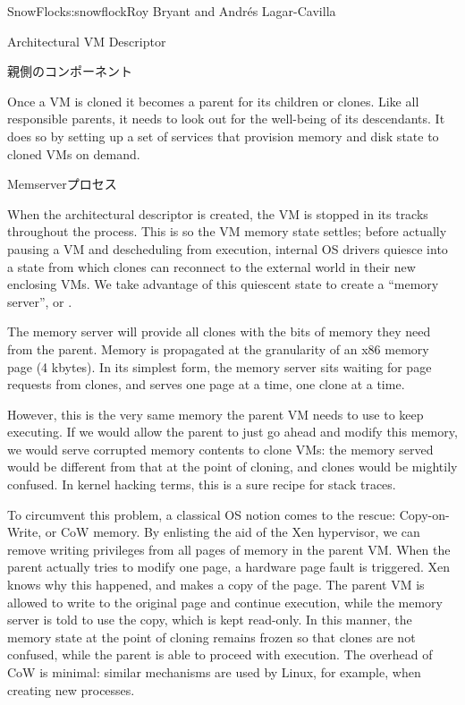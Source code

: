 \begin{aosachapter}{SnowFlock}{s:snowflock}{Roy Bryant and Andr\'e{s} Lagar-Cavilla}
\begin{aosasect1}{Architectural VM Descriptor}
\end{aosasect1}

\begin{aosasect1}{親側のコンポーネント}

Once a VM is cloned it becomes a parent for its children or
clones.  Like all responsible parents, it needs to look out for the
well-being of its descendants. It does so by setting up a set of
services that provision memory and disk state to cloned VMs on demand.

\begin{aosasect2}{Memserverプロセス}

When the architectural descriptor is created, the VM is stopped in its
tracks throughout the process. This is so the VM memory state settles;
before actually pausing a VM and descheduling from execution,
internal OS drivers quiesce into a state from which clones can
reconnect to the external world in their new enclosing VMs. We take
advantage of this quiescent state to create a ``memory server'',
or .

The memory server will provide all clones with the bits of memory they
need from the parent. Memory is propagated at the granularity of an
x86 memory page (4 kbytes). In its simplest form, the memory server sits
waiting for page requests from clones, and serves one page at a time,
one clone at a time.

However, this is the very same memory the parent VM needs to use to
keep executing. If we would allow the parent to just go ahead and
modify this memory, we would serve corrupted memory contents to clone
VMs: the memory served would be different from that at the point of
cloning, and clones would be mightily confused. In kernel hacking
terms, this is a sure recipe for stack traces.

To circumvent this problem, a classical OS notion comes to the rescue:
Copy-on-Write, or CoW memory. By enlisting the aid of the Xen
hypervisor, we can remove writing privileges from all pages of memory
in the parent VM\@. When the parent actually tries to modify one page, a
hardware page fault is triggered.  Xen knows why this happened, and
makes a copy of the page. The parent VM is allowed to write to the original
page and continue execution, while the memory server is told to use
the copy, which is kept read-only. In this manner, the memory state at the point of cloning
remains frozen so that clones are not confused, while the parent is
able to proceed with execution. The overhead of CoW is minimal:
similar mechanisms are used by Linux, for example, when creating new
processes.


\end{aosasect2}
\end{aosasect1}
\end{aosachapter}

